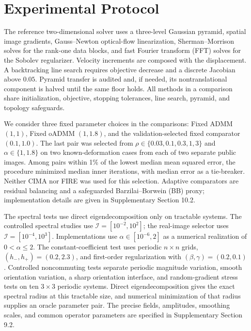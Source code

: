 \documentclass[11pt]{article}
\theoremstyle{definition}
\begin{document}
\section{Experimental Protocol}\label{sec:protocol}
The reference two-dimensional solver uses a three-level Gaussian pyramid,
spatial image gradients, Gauss--Newton optical-flow linearization,
Sherman--Morrison solves for the rank-one data blocks, and fast Fourier
transform (FFT) solves for the Sobolev regularizer. Velocity increments are
composed with the displacement. A
backtracking line search requires objective decrease and a discrete Jacobian
above $0.05$. Pyramid transfer is audited and, if needed, its
nontranslational component is halved until the same floor holds. All methods in
a comparison share initialization, objective, stopping tolerances, line search,
pyramid, and topology safeguards.

We consider three fixed parameter choices in the comparisons:
Fixed ADMM $(1, 1)$, Fixed oADMM $(1, 1.8)$, and the validation-selected fixed
comparator $(0.1, 1.0)$. The last pair was selected from
$\rho\in\{0.03,0.1,0.3,1,3\}$ and $\alpha\in\{1,1.8\}$ on two known-deformation
cases from each of two separate public images. Among pairs within 1\% of the
lowest median mean squared error, the procedure minimized median inner
iterations, with median error as a tie-breaker. Neither CIMA nor FIRE was used
for this selection. Adaptive comparators are residual balancing and a
safeguarded Barzilai--Borwein (BB) proxy; implementation details are given in
Supplementary Section 10.2.

The spectral tests use direct eigendecomposition only on tractable systems.
The controlled spectral studies use
$\mathcal I=[10^{-2},10^2]$; the real-image selector uses
$\mathcal I=[10^{-4},10^3]$. Implementations use
$\alpha\in[10^{-6},2]$ as a numerical realization of $0<\alpha\le2$.
The constant-coefficient test uses periodic $n\times n$ grids,
$(h_-,h_+)=(0.2,2.3)$, and first-order regularization with
$(\beta,\gamma)=(0.2,0.1)$. Controlled noncommuting tests separate periodic
magnitude variation, smooth orientation variation, a sharp orientation
interface, and random-gradient stress tests on ten $3\times3$ periodic systems.
Direct eigendecomposition gives the exact spectral radius at this tractable
size, and numerical minimization of that radius supplies an oracle parameter
pair. The precise fields, amplitudes, smoothing scales, and common operator
parameters are specified in Supplementary Section 9.2.
\end{document}
